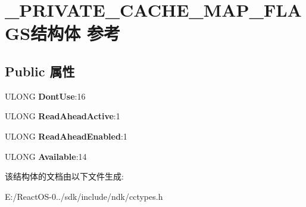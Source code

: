 \hypertarget{struct___p_r_i_v_a_t_e___c_a_c_h_e___m_a_p___f_l_a_g_s}{}\section{\+\_\+\+P\+R\+I\+V\+A\+T\+E\+\_\+\+C\+A\+C\+H\+E\+\_\+\+M\+A\+P\+\_\+\+F\+L\+A\+G\+S结构体 参考}
\label{struct___p_r_i_v_a_t_e___c_a_c_h_e___m_a_p___f_l_a_g_s}
\subsection*{Public 属性}
\begin{DoxyCompactItemize}
\item 
\mbox{\label{struct___p_r_i_v_a_t_e___c_a_c_h_e___m_a_p___f_l_a_g_s_aa99ed050d002bf90b63230b49b645155}} 
U\+L\+O\+NG {\bfseries Dont\+Use}\+:16
\item 
\mbox{\label{struct___p_r_i_v_a_t_e___c_a_c_h_e___m_a_p___f_l_a_g_s_afa2f777224fb75245fd4f095a3489af3}} 
U\+L\+O\+NG {\bfseries Read\+Ahead\+Active}\+:1
\item 
\mbox{\label{struct___p_r_i_v_a_t_e___c_a_c_h_e___m_a_p___f_l_a_g_s_a3480a9ad8725f8fdd50c1372d1e4c05f}} 
U\+L\+O\+NG {\bfseries Read\+Ahead\+Enabled}\+:1
\item 
\mbox{\label{struct___p_r_i_v_a_t_e___c_a_c_h_e___m_a_p___f_l_a_g_s_a38cb141446eade61b3cc434b7f63d71e}} 
U\+L\+O\+NG {\bfseries Available}\+:14
\end{DoxyCompactItemize}


该结构体的文档由以下文件生成\+:\begin{DoxyCompactItemize}
\item 
E\+:/\+React\+O\+S-\/0../sdk/include/ndk/cctypes.\+h\end{DoxyCompactItemize}
